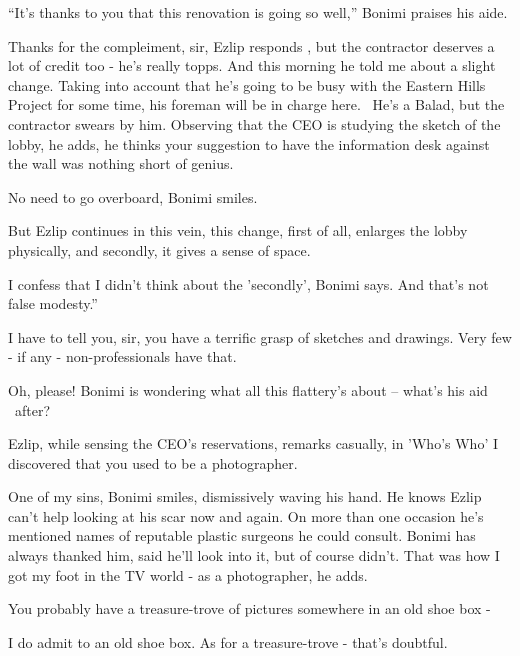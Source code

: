 \documentclass[letterpaper]{article}
\begin{document}
{}``It's thanks to you that this renovation is going so well,'' Bonimi\textcolor{red}{ }praises his aide.

{\textquotedbl}Thanks for the compleiment, sir,{\textquotedbl} Ezlip responds , {\textquotedbl}but the contractor
deserves a lot of credit too - he's really topps. And this morning he told me about a slight change. Taking into
account that he's going to be busy with the Eastern Hills Project for some time, his foreman will be in charge here.
~He's a Balad, but the contractor swears\textcolor{red}{ }by him.{\textquotedbl} Observing that the CEO is studying the
sketch of the lobby, he adds, {\textquotedbl}he thinks your suggestion to\textcolor{red}{ }have the information desk
against the wall was nothing short of genius.{\textquotedbl} 

{\textquotedbl}No need to go overboard,{\textquotedbl} Bonimi smiles. 

But Ezlip continues in this vein, {\textquotedbl}this change, first of all, enlarges the lobby physically, and secondly,
it gives a sense of space.{\textquotedbl}

{\textquotedbl}I confess that I didn't think about the 'secondly',{\textquotedbl} Bonimi says. {\textquotedbl}And that's
not false modesty.''

{\textquotedbl}I have to tell you, sir, you have a terrific grasp of sketches and drawings. Very few - if any -
non-professionals have that.{\textquotedbl} 

{\textquotedbl}Oh, please!{\textquotedbl} Bonimi is wondering what all this flattery's about -- what's his aid \ after? 

Ezlip, while sensing the CEO's reservations, remarks casually, {\textquotedbl}in 'Who's Who' I discovered that you used
to be a photographer.{\textquotedbl}

{\textquotedbl}One of my sins,{\textquotedbl} Bonimi smiles, dismissively waving his hand. He knows Ezlip can't help
looking at his scar now and again. On more than one occasion he's mentioned names of reputable\textcolor{red}{ }plastic
surgeons he could consult. Bonimi has always thanked him, said he'll look into it, but of course didn't.
{\textquotedbl}That was how I got my foot in the TV world - as a photographer,{\textquotedbl} he adds.

{\textquotedbl}You probably have a treasure-trove of pictures somewhere in an old shoe box -{\textquotedbl} 

{\textquotedbl}I do admit to an old shoe box. As for a treasure-trove - that's doubtful.{\textquotedbl}~ 
\end{document}
